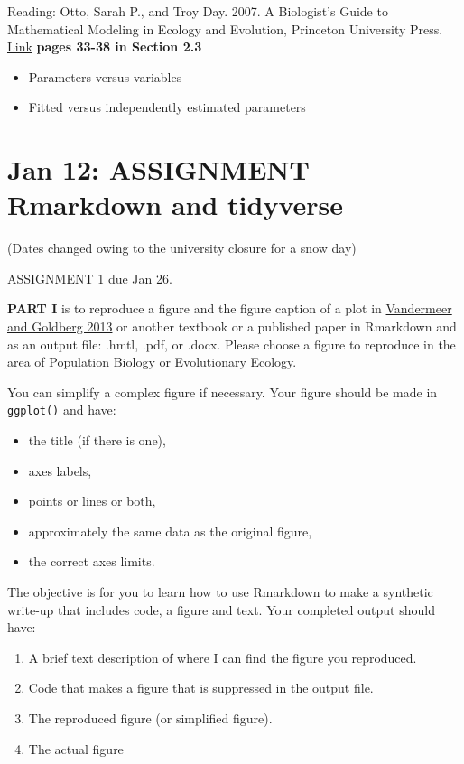 \documentclass[
]{book}
\providecommand{\tightlist}{%
  \setlength{\itemsep}{0pt}\setlength{\parskip}{0pt}}
\begin{document}
Reading: Otto, Sarah P., and Troy Day. 2007. A Biologist's Guide to Mathematical Modeling in Ecology and Evolution, Princeton University Press. \href{https://ebookcentral-proquest-com.qe2a-proxy.mun.ca/lib/mun/detail.action?docID=768551}{Link} \textbf{pages 33-38 in Section 2.3}

\begin{itemize}
\item
  Parameters versus variables
\item
  Fitted versus independently estimated parameters
\end{itemize}

\hypertarget{jan-12-assignment-rmarkdown-and-tidyverse}{%
\chapter{\texorpdfstring{Jan 12: \textbf{ASSIGNMENT} Rmarkdown and tidyverse}{Jan 12: ASSIGNMENT Rmarkdown and tidyverse}}\label{jan-12-assignment-rmarkdown-and-tidyverse}}

(Dates changed owing to the university closure for a snow day)

ASSIGNMENT 1 due Jan 26.

\textbf{PART I} is to reproduce a figure and the figure caption of a plot in \href{https://ebookcentral-proquest-com.qe2a-proxy.mun.ca/lib/mun/detail.action?docID=1205619}{Vandermeer and Goldberg 2013} or another textbook or a published paper in Rmarkdown and as an output file: .hmtl, .pdf, or .docx. Please choose a figure to reproduce in the area of Population Biology or Evolutionary Ecology.

You can simplify a complex figure if necessary. Your figure should be made in \texttt{ggplot()} and have:

\begin{itemize}
\item
  the title (if there is one),
\item
  axes labels,
\item
  points or lines or both,
\item
  approximately the same data as the original figure,
\item
  the correct axes limits.
\end{itemize}

The objective is for you to learn how to use Rmarkdown to make a synthetic write-up that includes code, a figure and text. Your completed output should have:

\begin{enumerate}
\def\labelenumi{\arabic{enumi}.}
\tightlist
\item
  A brief text description of where I can find the figure you reproduced.
\item
  Code that makes a figure that is suppressed in the output file.
\item
  The reproduced figure (or simplified figure).
\item
  The actual figure
\end{enumerate}
\end{document}
